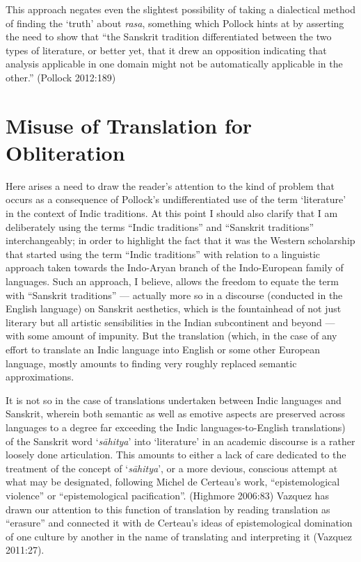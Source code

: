 This approach negates even the slightest possibility of taking a dialectical method of finding the ‘truth’ about \textsl{rasa}, something which Pollock hints at by asserting the need to show that “the Sanskrit tradition differentiated between the two types of literature, or better yet, that it drew an opposition indicating that analysis applicable in one domain might not be automatically applicable in the other.” (Pollock 2012:189)\\[-21pt]

\section*{Misuse of Translation for Obliteration}

Here arises a need to draw the reader’s attention to the kind of problem that occurs as a consequence of Pollock’s undifferentiated use of the term ‘literature’ in the context of Indic traditions. At this point I should also clarify that I am deliberately using the terms “Indic traditions” and “Sanskrit traditions” interchangeably; in order to highlight the fact that it was the Western scholarship that started using the term “Indic traditions” with relation to a linguistic approach taken towards the Indo-Aryan branch of the Indo-European family of languages. Such an approach, I believe, allows the freedom to equate the term with “Sanskrit traditions” --- actually more so in a discourse (conducted in the English language) on Sanskrit aesthetics, which is the fountainhead of not just literary but all artistic sensibilities in the Indian subcontinent and beyond --- with some amount of impunity. But the translation (which, in the case of any effort to translate an Indic language into English or some other European language, mostly amounts to finding very roughly replaced semantic approximations. 

It is not so in the case of translations undertaken between Indic languages and Sanskrit, wherein both semantic as well as emotive aspects are preserved across languages to a degree far exceeding the Indic languages-to-English translations) of the Sanskrit word ‘\textsl{sāhitya}’ into ‘literature’ in an academic discourse is a rather loosely done articulation. This amounts to either a lack of care dedicated to the treatment of the concept of ‘\textsl{sāhitya}’, or a more devious, conscious attempt at what may be designated, following Michel de Certeau’s work, “epistemological violence” or “epistemological pacification”. (Highmore 2006:83) Vazquez has drawn our attention to this function of translation by reading translation as “erasure” and connected it with de Certeau’s ideas of epistemological domination of one culture by another in the name of translating and interpreting it (Vazquez 2011:27). 

